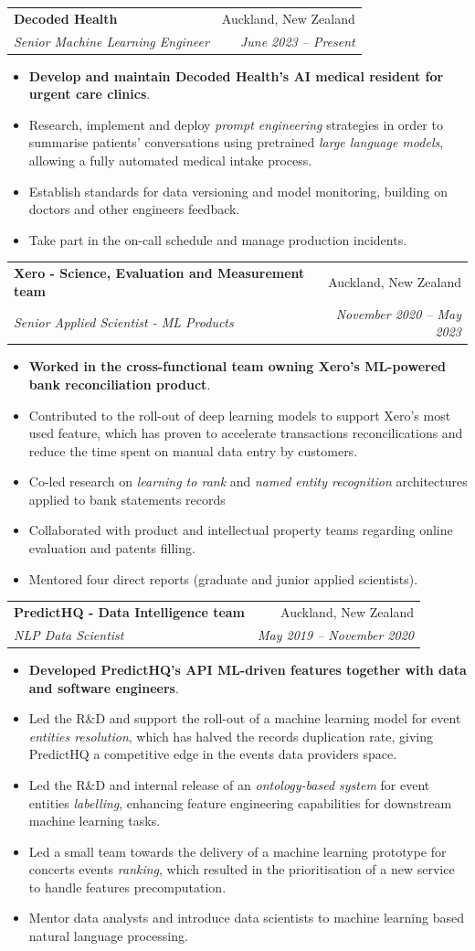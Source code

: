 \documentclass[letterpaper,11pt]{article}
\makeatletter
\newcommand{\resumeItemBis}[2]{
  \item\small{
    \textbf{#1}{#2 \vspace{-2pt}}
  }
}
\newcommand{\resumeSubheading}[4]{
  \vspace{-1pt}\item
    \begin{tabular*}{0.97\textwidth}[t]{l@{\extracolsep{\fill}}r}
      \textbf{#1} & #2 \\
      \textit{\small#3} & \textit{\small #4} \\
    \end{tabular*}\vspace{-5pt}
}
\newcommand{\resumeItemListStart}{\begin{itemize}}
\newcommand{\resumeItemListEnd}{\end{itemize}\vspace{-5pt}}
\makeatother
\begin{document}
  \resumeSubheading
    {Decoded Health}{Auckland, New Zealand}
    {Senior Machine Learning Engineer}{June 2023 -- Present}
    \resumeItemListStart
      \resumeItemBis{Develop and maintain Decoded Health's AI medical resident for urgent care clinics}{.}
      \resumeItemBis{} {Research, implement and deploy \emph{prompt engineering} strategies in order to summarise patients' conversations using pretrained \emph{large language models}, allowing a fully automated medical intake process.}
      \resumeItemBis{} {Establish standards for data versioning and model monitoring, building on doctors and other engineers feedback.}
      \resumeItemBis{} {Take part in the on-call schedule and manage production incidents.}
      \resumeItemListEnd

	\resumeSubheading
      {Xero - Science, Evaluation and Measurement team}{Auckland, New Zealand}
      {Senior Applied Scientist - ML Products}{November 2020 -- May 2023}
      \resumeItemListStart
        \resumeItemBis{Worked in the cross-functional team owning Xero's ML-powered bank reconciliation product}{.}
        \resumeItemBis{} {Contributed to the roll-out of deep learning models to support Xero's most used feature, which has proven to accelerate transactions reconcilications and reduce the time spent on manual data entry by customers.}
        \resumeItemBis{} {Co-led research on \emph{learning to rank} and \emph{named entity recognition} architectures applied to bank statements records}
        \resumeItemBis{} {Collaborated with product and intellectual property teams regarding online evaluation and patents filling.}
        \resumeItemBis{} {Mentored four direct reports (graduate and junior applied scientists).}
        \resumeItemListEnd

	\resumeSubheading
      {PredictHQ - Data Intelligence team}{Auckland, New Zealand}
      {NLP Data Scientist}{May 2019 -- November 2020}
      \resumeItemListStart
        \resumeItemBis{Developed PredictHQ's API ML-driven features together with data and software engineers}{.}
          \resumeItemBis{} {Led the R\&D and support the roll-out of a machine learning model for event \emph{entities resolution}, which has halved the records duplication rate, giving PredictHQ a competitive edge in the events data providers space.}
          \resumeItemBis{} {Led the R\&D and internal release of an \emph{ontology-based system} for event entities \emph{labelling}, enhancing feature engineering capabilities for downstream machine learning tasks.}
          \resumeItemBis{} {Led a small team towards the delivery of a machine learning prototype for concerts events \emph{ranking}, which resulted in the prioritisation of a new service to handle features precomputation.}
          \resumeItemBis{} {Mentor data analysts and introduce data scientists to machine learning based natural language processing.}
          \resumeItemListEnd	
	
\end{document}
